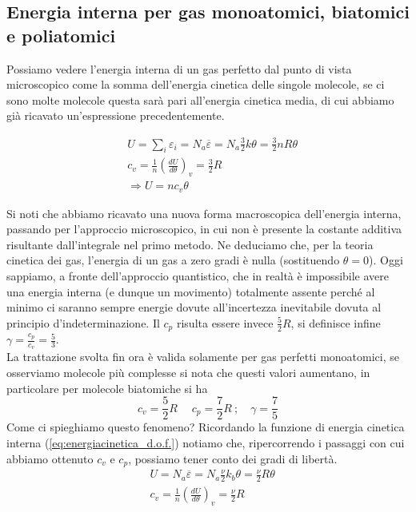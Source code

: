 \documentclass[10pt,a4paper]{article}
\begin{document}
\subsection{Energia interna per gas monoatomici, biatomici e poliatomici}\label{sec:energia_interna_mono_bi_poli}
Possiamo vedere l'energia interna di un gas perfetto dal punto di vista microscopico come la somma dell'energia cinetica delle singole molecole, se ci sono molte molecole questa sarà pari all'energia cinetica media, di cui abbiamo già ricavato un'espressione precedentemente. 

\begin{align*} 
	&U = \sum_i \varepsilon_i= N_a \overline{\varepsilon} = N_a \frac{3}{2} k \theta = \frac{3}{2}n R \theta\\
	&c_v = \frac{1}{n}\left(\frac{dU}{d\theta}\right)_v=\frac{3}{2}R\\
	&\Rightarrow U = n c_v\theta
\end{align*} 

Si noti che abbiamo ricavato una nuova forma macroscopica dell'energia interna, passando per l'approccio microscopico, in cui non è presente la costante additiva risultante dall'integrale nel primo metodo. Ne deduciamo che, per la teoria cinetica dei gas, l'energia di un gas a zero gradi è nulla (sostituendo $\theta=0$). Oggi sappiamo, a fronte dell'approccio quantistico, che in realtà è impossibile avere una energia interna (e dunque un movimento) totalmente assente perché al minimo ci saranno sempre energie dovute all'incertezza inevitabile dovuta al principio d'indeterminazione. Il $c_p$ risulta essere invece \(\frac{5}{2}R\), si definisce infine $\gamma=\frac{c_p}{c_v}=\frac{5}{3}$.\\
La trattazione svolta fin ora è valida solamente per gas perfetti monoatomici, se osserviamo molecole più complesse si nota che questi valori aumentano, in particolare per molecole biatomiche si ha
\[c_v=\frac{5}{2}R\;\quad c_p=\frac{7}{2}R\ ; \quad \gamma = \frac{7}{5}\]
Come ci spieghiamo questo fenomeno? Ricordando la funzione di energia cinetica interna (\ref{eq:energiacinetica_d.o.f.}) notiamo che, ripercorrendo i passaggi con cui abbiamo ottenuto $c_v$ e $c_p$, possiamo tener conto dei gradi di libertà.
\begin{align*} 
	&U = N_a \overline{\varepsilon} = N_a \frac{\nu}{2} k_b \theta = \frac{\nu}{2} R \theta\\
	&c_v = \frac{1}{n}\left(\frac{dU}{d\theta}\right)_v=\frac{\nu}{2}R
\end{align*} 
\end{document}

